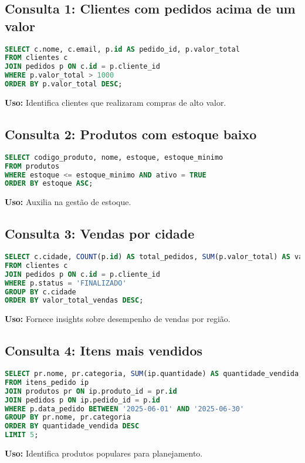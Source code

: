 \documentclass[a4paper,12pt]{article}
\begin{document}
\subsection{Consulta 1: Clientes com pedidos acima de um valor}
\begin{lstlisting}[language=SQL]
SELECT c.nome, c.email, p.id AS pedido_id, p.valor_total
FROM clientes c
JOIN pedidos p ON c.id = p.cliente_id
WHERE p.valor_total > 1000
ORDER BY p.valor_total DESC;
\end{lstlisting}
\textbf{Uso:} Identifica clientes que realizaram compras de alto valor.

\subsection{Consulta 2: Produtos com estoque baixo}
\begin{lstlisting}[language=SQL]
SELECT codigo_produto, nome, estoque, estoque_minimo
FROM produtos
WHERE estoque <= estoque_minimo AND ativo = TRUE
ORDER BY estoque ASC;
\end{lstlisting}
\textbf{Uso:} Auxilia na gestão de estoque.

\subsection{Consulta 3: Vendas por cidade}
\begin{lstlisting}[language=SQL]
SELECT c.cidade, COUNT(p.id) AS total_pedidos, SUM(p.valor_total) AS valor_total_vendas
FROM clientes c
JOIN pedidos p ON c.id = p.cliente_id
WHERE p.status = 'FINALIZADO'
GROUP BY c.cidade
ORDER BY valor_total_vendas DESC;
\end{lstlisting}
\textbf{Uso:} Fornece insights sobre desempenho de vendas por região.

\subsection{Consulta 4: Itens mais vendidos}
\begin{lstlisting}[language=SQL]
SELECT pr.nome, pr.categoria, SUM(ip.quantidade) AS quantidade_vendida, SUM(ip.subtotal) AS receita_total
FROM itens_pedido ip
JOIN produtos pr ON ip.produto_id = pr.id
JOIN pedidos p ON ip.pedido_id = p.id
WHERE p.data_pedido BETWEEN '2025-06-01' AND '2025-06-30'
GROUP BY pr.nome, pr.categoria
ORDER BY quantidade_vendida DESC
LIMIT 5;
\end{lstlisting}
\textbf{Uso:} Identifica produtos populares para planejamento.
\end{document}

